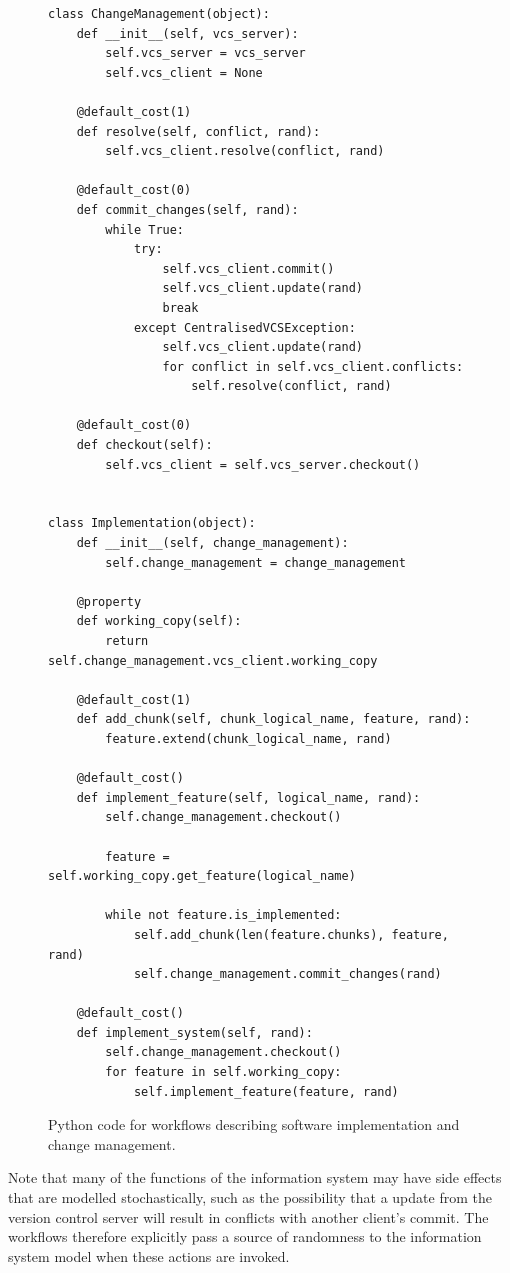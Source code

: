 \documentclass{llncs}
\begin{document}
\begin{figure}
  \centering
\begin{lstlisting}
class ChangeManagement(object):
    def __init__(self, vcs_server):
        self.vcs_server = vcs_server
        self.vcs_client = None

    @default_cost(1)
    def resolve(self, conflict, rand):
        self.vcs_client.resolve(conflict, rand)

    @default_cost(0)
    def commit_changes(self, rand):
        while True:
            try:
                self.vcs_client.commit()
                self.vcs_client.update(rand)
                break
            except CentralisedVCSException:
                self.vcs_client.update(rand)
                for conflict in self.vcs_client.conflicts:
                    self.resolve(conflict, rand)

    @default_cost(0)
    def checkout(self):
        self.vcs_client = self.vcs_server.checkout()


class Implementation(object):
    def __init__(self, change_management):
        self.change_management = change_management

    @property
    def working_copy(self):
        return self.change_management.vcs_client.working_copy

    @default_cost(1)
    def add_chunk(self, chunk_logical_name, feature, rand):
        feature.extend(chunk_logical_name, rand)

    @default_cost()
    def implement_feature(self, logical_name, rand):
        self.change_management.checkout()

        feature = self.working_copy.get_feature(logical_name)

        while not feature.is_implemented:
            self.add_chunk(len(feature.chunks), feature, rand)
            self.change_management.commit_changes(rand)

    @default_cost()
    def implement_system(self, rand):
        self.change_management.checkout()
        for feature in self.working_copy:
            self.implement_feature(feature, rand)

\end{lstlisting}
  \caption{Python code for workflows describing software implementation and change management.}
  \label{fig:workflows}

\end{figure}

Note that many of the functions of the information system may have side effects that are modelled stochastically, such
as the possibility that a update from the version control server will result in conflicts with another client's commit.
The workflows therefore explicitly pass a source of randomness to the information system model when these actions are
invoked.
\end{document}
